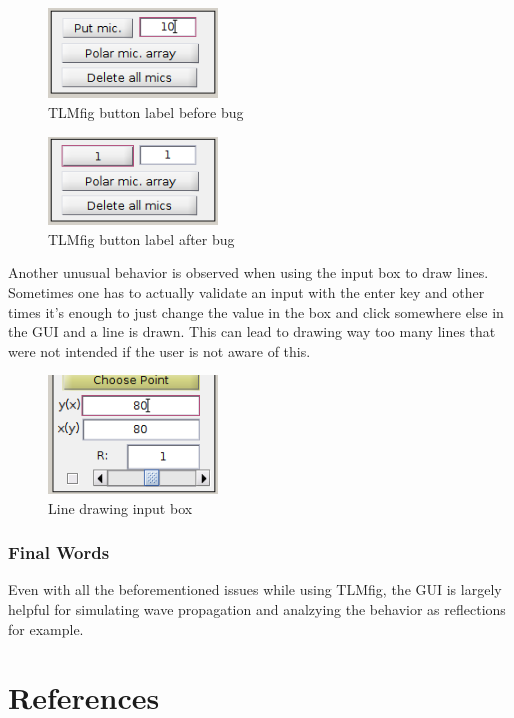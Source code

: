 \documentclass[twocolumn]{article}
\begin{document}
\begin{figure}[H]
    \centering
    \includegraphics[width=45mm]{./Images/tlm_fig_button_label_good.png}
    \caption{TLMfig button label before bug}
\end{figure}
\begin{figure}[H]
    \centering
    \includegraphics[width=45mm]{./Images/tlm_fig_button_label_bad.png}
    \caption{TLMfig button label after bug}
\end{figure}

Another unusual behavior is observed when using the input box to draw lines.
Sometimes one has to actually validate an input with the enter key and other times
it's enough to just change the value in the box and click somewhere else in the GUI
and a line is drawn.
This can lead to drawing way too many lines that were not intended if the user is not
aware of this.

\begin{figure}[H]
    \centering
    \includegraphics[width=45mm]{./Images/tlm_fig_updating_lines.png}
    \caption{Line drawing input box}
\end{figure}

\subsubsection{Final Words}
Even with all the beforementioned issues while using TLMfig, the GUI is largely helpful
for simulating wave propagation and analzying the behavior as reflections for example.


\section{References}

\small


\end{document}
